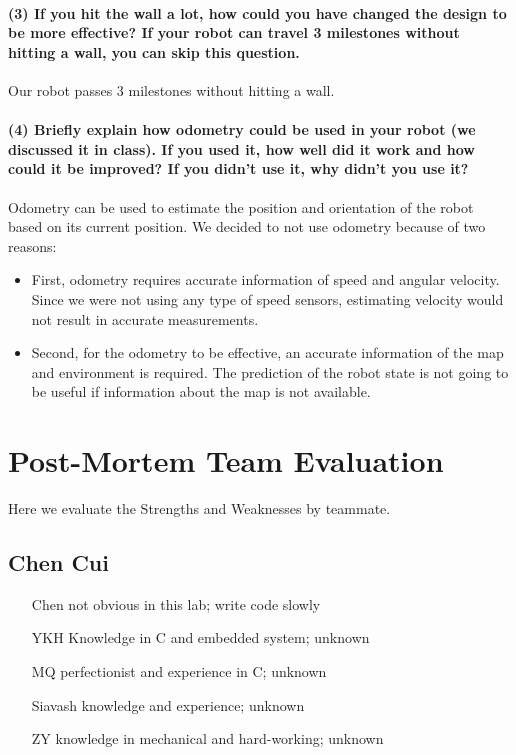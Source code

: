 \documentclass[a4paper]{article}
\begin{document}
\paragraph{(3) If you hit the wall a lot, how could you have changed the design to be more effective? If your robot can 
travel 3 milestones without hitting a wall, you can skip this question. \\}

Our robot passes 3 milestones without hitting a wall.

\paragraph{(4) Briefly explain how odometry could be used in your robot (we discussed it in class). If you used it, how 
well did it work and how could it be improved? If you didn’t use it, why didn’t you use it? \\}

Odometry can be used to estimate the position and orientation of the robot based on its current position. We decided to not use odometry because of two reasons:
\begin{itemize}
\item{First}, odometry requires accurate information of speed and angular velocity. Since we were not using any type of speed sensors, estimating velocity would not result in accurate measurements.
\item{Second}, for the odometry to be effective, an accurate information of the map and environment is required. The prediction of the robot state is not going to be useful if information about the map is not available. 
\end{itemize}


\section{Post-Mortem Team Evaluation}
Here we evaluate the Strengths and Weaknesses by teammate.

\subsection{Chen Cui}
\begin{itemize}
\item[Chen] not obvious in this lab; write code slowly
\item[YKH] Knowledge in C and embedded system; unknown
\item[MQ] perfectionist and experience in C; unknown
\item[Siavash] knowledge and experience; unknown
\item[ZY] knowledge in mechanical and hard-working; unknown
\end{itemize}
\end{document}
